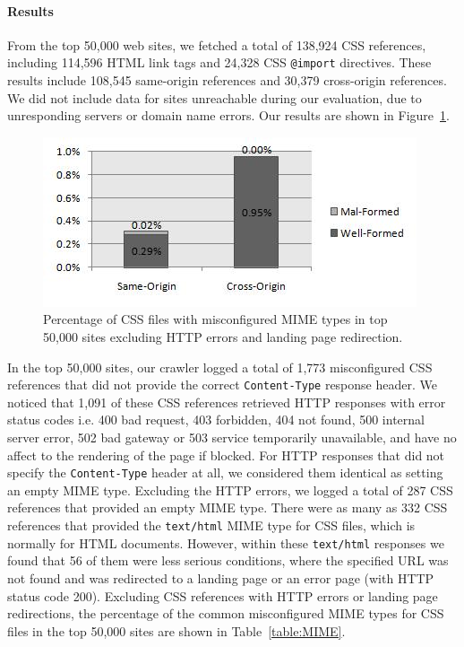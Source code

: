 \documentclass{acm_proc_article-sp}
\begin{document}
\paragraph{Results}
From the top 50,000 web sites, we fetched a total of 138,924 CSS references, including 114,596 HTML link tags and 24,328 CSS \texttt{@import} directives. These results include 108,545 same-origin references and 30,379 cross-origin references. We did not include data for sites unreachable during our evaluation, due to unresponding servers or domain name errors. Our results are shown in Figure~\ref{figure:MIME}.

\begin{figure}
\centering
\includegraphics[width=\linewidth]{mime.jpg}
\caption{Percentage of CSS files with misconfigured MIME types in top 50,000 sites excluding HTTP errors and landing page redirection.}
\label{figure:MIME}
\end{figure}

In the top 50,000 sites, our crawler logged a total of 1,773 misconfigured CSS references that did not provide the correct \texttt{Content-Type} response header. We noticed that 1,091 of these CSS references retrieved HTTP responses with error status codes i.e. 400 bad request, 403 forbidden, 404 not found, 500 internal server error, 502 bad gateway or 503 service temporarily unavailable, and have no affect to the rendering of the page if blocked. For HTTP responses that did not specify the \texttt{Content-Type} header at all, we considered them identical as setting an empty MIME type. Excluding the HTTP errors, we logged a total of 287 CSS references that provided an empty MIME type. There were as many as 332 CSS references that provided the \verb|text/html| MIME type for CSS files, which is normally for HTML documents. However, within these \texttt{text/html} responses we found that 56 of them were less serious conditions, where the specified URL was not found and was redirected to a landing page or an error page (with HTTP status code 200). Excluding CSS references with HTTP errors or landing page redirections, the percentage of the common misconfigured MIME types for CSS files in the top 50,000 sites are shown in Table~\ref{table:MIME}.
\end{document}
